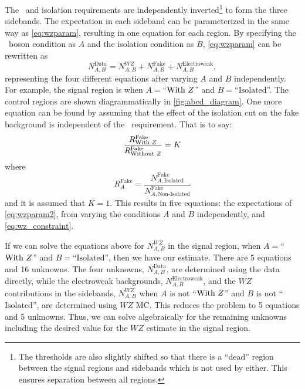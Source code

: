 The \z~and isolation requirements are 
independently inverted\footnote{The thresholds are also slightly shifted 
so that there is a ``dead'' region between the signal regions and sidebands 
which is not used by either. This ensures separation between all regions.}
to form the three sidebands.
The expectation in each sideband can be parameterized
in the same way as \eqn\eqref{eq:wzparam}, resulting in one
equation for each region. By specifying the \z~boson condition
as $A$ and the isolation condition as $B$, \eqn\eqref{eq:wzparam}
can be rewritten as
\begin{equation}
\label{eq:wzparam2}
N^{\textrm{Data}}_{A,B} =  N^{WZ}_{A,B} + N^{\textrm{Fake}}_{A,B} + N^{\textrm{Electroweak}}_{A,B},
\end{equation}
representing the four different equations after varying $A$ and $B$ independently.
For example, the signal region is when $A=$``$\textrm{With \ensuremath{Z}}$'' and
$B=$``$\textrm{Isolated}$''.
The control regions are shown diagrammatically in \fig\ref{fig:abcd_diagram}.
One more equation can be found by assuming that the effect of 
the isolation cut on the fake background is 
independent of the \z~requirement.
That is to say:
\begin{equation}
\label{eq:wz_constraint}
\frac{R^{\textrm{Fake}}_{\textrm{With \ensuremath{Z}}}}{R^{\textrm{Fake}}_{\textrm{Without \ensuremath{Z}}}} = K
\end{equation}
where 
\begin{equation}
R^{\textrm{Fake}}_{A} = 
\frac{N^{\textrm{Fake}}_{A,\textrm{Isolated}}}
{N^{\textrm{Fake}}_{A,\textrm{Non-Isolated}}}
\end{equation}
and it is assumed that $K=1$.
This results in five equations: the expectations of 
\eqn\eqref{eq:wzparam2}, from varying the conditions $A$ and $B$ independently,
and \eqn\eqref{eq:wz_constraint}.




If we can solve the equations above for $N^{WZ}_{A,B}$ in the signal region,
when $A=$``$\textrm{With \ensuremath{Z}}$'' and $B=$``$\textrm{Isolated}$'',
then we have our estimate. 
There are 5 equations and 16 unknowns. The four unknowns, $N^{\textrm{Data}}_{A,B}$,
are determined using the data directly, while 
the electroweak backgrounds, $N^{\textrm{Electroweak}}_{A,B}$,
and the $WZ$ contributions in the sidebands, $N^{WZ}_{A,B}$ 
when $A$ is not ``$\textrm{With \ensuremath{Z}}$'' and $B$ is not ``$\textrm{Isolated}$'',
are determined using $WZ$ MC. This reduces the problem to 5 equations
and 5 unknowns. Thus, we can solve algebraically for the remaining unknowns
including the desired value for the $WZ$ estimate in the signal region.

